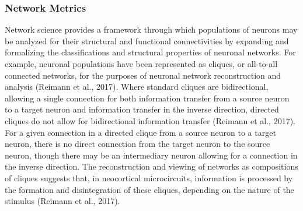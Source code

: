 \documentclass[11pt,titlepage]{article}
\begin{document}
\subsubsection{Network Metrics}\label{sssec:NM}
Network science provides a framework through which populations of neurons may be analyzed for their structural and functional connectivities by expanding and formalizing the classifications and structural properties of neuronal networks. For example, neuronal populations have been represented as cliques, or all-to-all connected networks, for the purposes of neuronal network reconstruction and analysis (Reimann et al., 2017). Where standard cliques are bidirectional, allowing a single connection for both information transfer from a source neuron to a target neuron and information transfer in the inverse direction, directed cliques do not allow for bidirectional information transfer (Reimann et al., 2017). For a given connection in a directed clique from a source neuron to a target neuron, there is no direct connection from the target neuron to the source neuron, though there may be an intermediary neuron allowing for a connection in the inverse direction. The reconstruction and viewing of networks as compositions of cliques suggests that, in neocortical microcircuits, information is processed by the formation and disintegration of these cliques, depending on the nature of the stimulus (Reimann et al., 2017).\par
\end{document}
